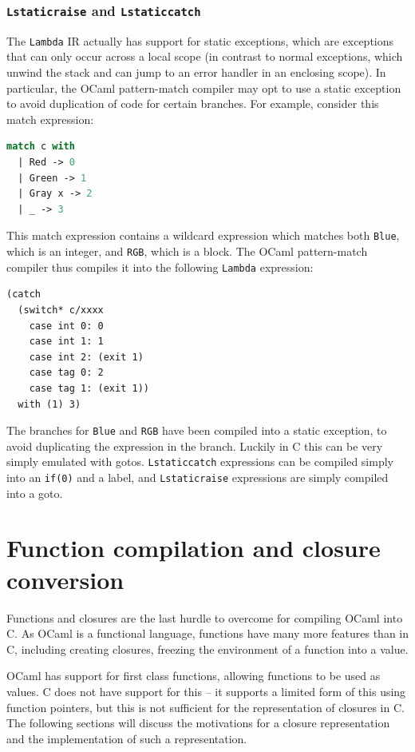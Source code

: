\documentclass[12pt,a4paper,twoside,openright]{report}
\begin{document}
\subsubsection{\texttt{Lstaticraise} and \texttt{Lstaticcatch}}

The \texttt{Lambda} IR actually has support for static exceptions, which are 
exceptions that can only occur across a local scope (in contrast to normal 
exceptions, which unwind the stack and can jump to an error handler in an 
enclosing scope). In particular, the OCaml pattern-match compiler may opt to 
use a static exception to avoid duplication of code for certain branches. For 
example, consider this match expression:

\begin{lstlisting}[language=Caml]
match c with
  | Red -> 0
  | Green -> 1
  | Gray x -> 2
  | _ -> 3
\end{lstlisting}

This match expression contains a wildcard expression which matches both 
\texttt{Blue}, which is an integer, and \texttt{RGB}, which is a block. The 
OCaml pattern-match compiler thus compiles it into the following 
\texttt{Lambda} expression:

\begin{lstlisting}
(catch
  (switch* c/xxxx
    case int 0: 0
    case int 1: 1
    case int 2: (exit 1)
    case tag 0: 2
    case tag 1: (exit 1))
  with (1) 3)
\end{lstlisting}

The branches for \texttt{Blue} and \texttt{RGB} have been compiled into a 
static exception, to avoid duplicating the expression in the branch. Luckily in 
C this can be very simply emulated with gotos. \texttt{Lstaticcatch} 
expressions can be compiled simply into an \texttt{if(0)} and a label, and 
\texttt{Lstaticraise} expressions are simply compiled into a goto.

\section{Function compilation and closure conversion} \label{functions}

Functions and closures are the last hurdle to overcome for compiling OCaml into 
C. As OCaml is a functional language, functions have many more features than in 
C, including creating closures, freezing the environment of a function into a 
value.

OCaml has support for first class functions, allowing functions to be used as 
values. C does not have support for this -- it supports a limited form of this 
using function pointers, but this is not sufficient for the representation of 
closures in C. The following sections will discuss the motivations for a 
closure representation and the implementation of such a representation.
\end{document}
